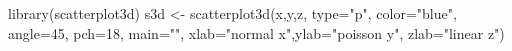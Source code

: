 \begin{Schunk}
\begin{Sinput}
 library(scatterplot3d)
 s3d <- scatterplot3d(x,y,z, type="p", color="blue", angle=45, pch=18, main="", xlab="normal x",ylab="poisson y", zlab="linear z")
\end{Sinput}
\end{Schunk}
